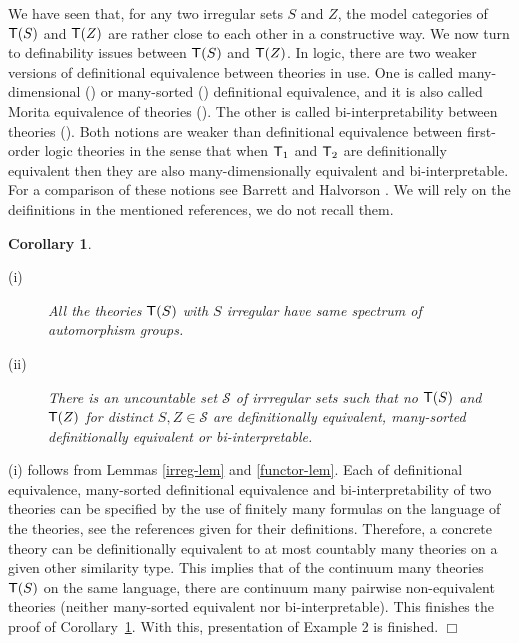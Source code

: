 \documentclass[12pt,leqno]{article}
\newcommand{\T}{\mbox{\sf T}}
\newcommand{\qed}{\hfill\mbox{\bf QED}\bigskip}
\newtheorem{cor}{Corollary}
\begin{document}
We have seen that, for any two irregular sets $S$ and $Z$, the model categories of $\T(S)$ and $\T(Z)$ are rather close to each other in a constructive way. We now turn to definability issues between $\T(S)$ and $\T(Z)$. In logic, there are two weaker versions of definitional equivalence between theories in use. One is called many-dimensional (\cite{Visser, harnik}) or many-sorted (\cite{Mad02, AN}) definitional equivalence, and it is also called Morita equivalence of theories (\cite{BH16, Halvorson}). The other is called bi-interpretability between theories %
(\cite{Hodges, Visser}). Both notions are weaker than definitional equivalence between first-order logic theories in the sense that when $\T_1$ and $\T_2$ are definitionally equivalent then they are also many-dimensionally equivalent and bi-interpretable. For a comparison of these notions see Barrett and Halvorson \cite{BH16}. We will rely on the deifinitions in the mentioned references, we do not recall them.

\begin{cor}\label{def-cor}\mbox{}
	\begin{description}
		\item[(i)] All the theories $\T(S)$ with $S$ irregular have same spectrum of automorphism groups.
		\item[(ii)] There is an uncountable set $\mathcal S$ of irrregular sets such that no $\T(S)$ and $\T(Z)$ for distinct $S,Z\in\mathcal S$ are definitionally equivalent, many-sorted definitionally equivalent or bi-interpretable. 
	\end{description}	
\end{cor}

	 (i) follows from Lemmas \ref{irreg-lem} and \ref{functor-lem}. Each of definitional equivalence, many-sorted definitional equivalence and bi-interpretability of two theories can be specified by the use of finitely many formulas on the language of the theories, see the references given for their definitions. Therefore, a concrete theory can be definitionally equivalent to at most countably many theories on a given other similarity type. This implies that of the continuum many theories $\T(S)$ on the same language, there are continuum many pairwise non-equivalent theories (neither many-sorted equivalent nor bi-interpretable). This finishes the proof of Corollary~\ref{def-cor}. %
With this, presentation of Example 2 is finished. \quad $\Box$
\end{document}
